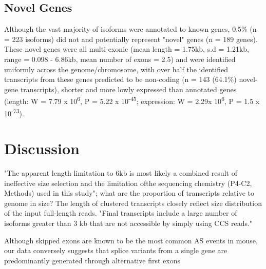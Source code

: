 \subsection{Novel Genes}
\label{sec:whole_novelgenes}
Although the vast majority of isoforms were annotated to known genes, 0.5\% (n = 223 isoforms) did not and potentially represent "novel" genes (n = 189 genes). These novel genes were all multi-exonic (mean length = 1.75kb, s.d = 1.21kb, range = 0.098 - 6.86kb, mean number of exons = 2.5) and were identified uniformly across the genome/chromosome, with over half the identified transcripts from these genes predicted to be non-coding (n = 143 (64.1\%) novel-gene transcripts), shorter and more lowly expressed than annotated genes (length: W = 7.79 x 10\textsuperscript{6}, P = 5.22 x 10\textsuperscript{-45}; expression: W = 2.29x 10\textsuperscript{6}, P = 1.5 x 10\textsuperscript{-73}).


\newpage
\section{Discussion}
"The apparent length limitation to 6kb is most likely a combined result of ineffective size selection and the limitation ofthe sequencing chemistry (P4-C2, Methods) used in this study"; what are the proportion of transcripts relative to genome in size? The length of clustered transcripts closely reflect size distribution of the input full-length reads. "Final transcripts include a large number of isoforms greater than 3 kb that are not accessible by simply using CCS reads."   

Although skipped exons are known to be the most common AS events in mouse, our data conversely suggests that splice variants from a single gene are predominantly generated through alternative first exons 

